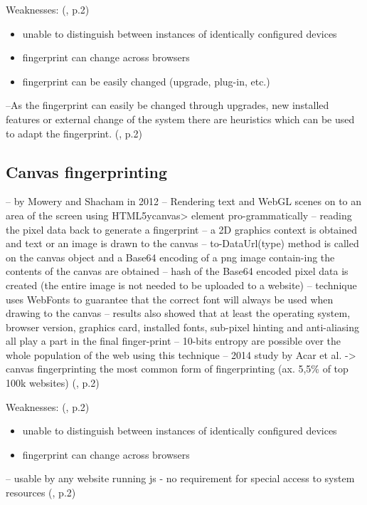 Weaknesses: (\textcite{upi15}, p.2)
\begin{itemize}
	\item unable to distinguish between instances of identically configured devices
	\item fingerprint can change across browsers
	\item fingerprint can be easily changed (upgrade, plug-in, etc.)
\end{itemize}
--As the fingerprint can easily be changed through upgrades, new installed features or external change of the system there are heuristics which can be used to adapt the fingerprint.  (\textcite{upi15}, p.2)

\subsection{Canvas fingerprinting}

-- by Mowery and Shacham in 2012
-- Rendering text and WebGL scenes on to an area of the screen using HTML5ycanvas> element pro-grammatically
--  reading the pixel data back to generate a fingerprint
--  a 2D graphics context is obtained and text or an image is drawn to the canvas
-- to-DataUrl(type) method is called on the canvas object and a Base64 encoding of a png image contain-ing the contents of the canvas are obtained
-- hash of the Base64 encoded pixel data is created (the entire image is not needed to be uploaded to a website)
--  technique uses WebFonts to guarantee that the correct font will always be used when drawing to the canvas
-- results also showed that at least the operating system, browser version, graphics card, installed fonts, sub-pixel hinting and anti-aliasing all play a part in the final finger-print
-- 10-bits entropy are possible over the whole population of the web using this technique
-- 2014 study by Acar et al. -> canvas fingerprinting the most common form of fingerprinting (ax. 5,5\% of top 100k websites)
 (\textcite{upi15}, p.2)

Weaknesses: (\textcite{upi15}, p.2)
\begin{itemize}
	\item unable to distinguish between instances of identically configured devices
	\item fingerprint can change across browsers
\end{itemize}

-- usable by any website running js - no requirement for special access to system resources
(\textcite{upi15}, p.2)


